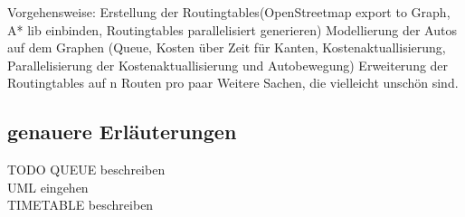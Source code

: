 \documentclass[article, paper=A4,pagesize=auto,11pt,headinclude=true,footinclude=true,BCOR=0mm,DIV=calc]{scrartcl}
\begin{document}
Vorgehensweise:
Erstellung der Routingtables(OpenStreetmap export to Graph, A* lib einbinden, Routingtables parallelisiert generieren)
Modellierung der Autos auf dem  Graphen (Queue, Kosten über Zeit für Kanten, Kostenaktuallisierung, Parallelisierung der Kostenaktuallisierung und Autobewegung)
Erweiterung der Routingtables auf n Routen pro paar
Weitere Sachen, die vielleicht unschön sind.

\subsection{genauere Erläuterungen}

TODO QUEUE beschreiben\\
UML eingehen\\
TIMETABLE beschreiben\\



	
	
	
\end{document}
